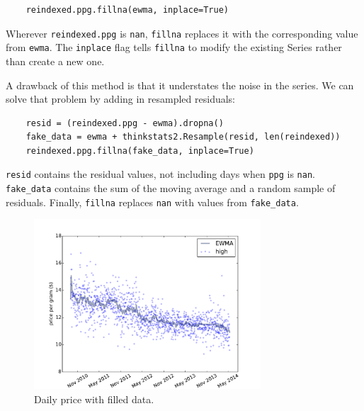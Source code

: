 \documentclass[12pt]{book}
\begin{document}
\begin{verbatim}
    reindexed.ppg.fillna(ewma, inplace=True)
\end{verbatim}

Wherever {\tt reindexed.ppg} is {\tt nan}, {\tt fillna} replaces
it with the corresponding value from {\tt ewma}.  The {\tt inplace}
flag tells {\tt fillna} to modify the existing Series rather than
create a new one.

A drawback of this method is that it understates the noise in the
series.  We can solve that problem by adding in resampled
residuals:

\begin{verbatim}
    resid = (reindexed.ppg - ewma).dropna()
    fake_data = ewma + thinkstats2.Resample(resid, len(reindexed))
    reindexed.ppg.fillna(fake_data, inplace=True)
\end{verbatim}


{\tt resid} contains the residual values, not including days
when {\tt ppg} is {\tt nan}.  \verb"fake_data" contains the
sum of the moving average and a random sample of residuals.
Finally, {\tt fillna} replaces {\tt nan} with values from
\verb"fake_data".

\begin{figure}
\centerline{\includegraphics[height=2.5in]{figs/timeseries8.pdf}}
\caption{Daily price with filled data.}
\label{timeseries8}
\end{figure}
\end{document}
